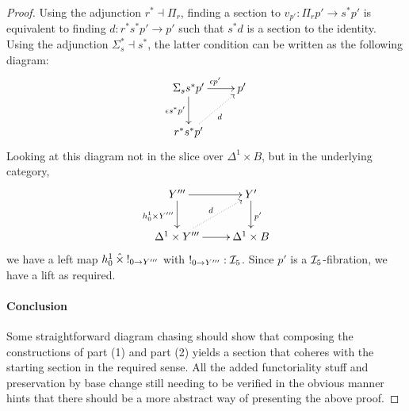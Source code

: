 \documentclass[reqno,10pt,a4paper,oneside]{amsart}
\begin{document}
\begin{proof}
Using the adjunction $r^* \dashv \Pi_r$, finding a section to $v_{p'} : \Pi_r p' \to s^* p'$ is equivalent to finding $d : r^* s^* p' \to p'$ such that $s^* d$ is a section to the identity.
Using the adjunction $\Sigma_s^* \dashv s^*$, the latter condition can be written as the following diagram:
\[
\xymatrix{
  \Sigma_s s^* p'
  \ar[r]^{\epsilon p'}
  \ar[d]_{\epsilon s^* p'}
&
  p'
\\
  r^* s^* p'
  \ar@{.>}[ur]_{d}
}
\]
Looking at this diagram not in the slice over $\Delta^1 \times B$, but in the underlying category,
\[
\xymatrix{
  Y'''
  \ar[d]_{h_0^1 \times Y'''}
  \ar[r]
&
  Y'
  \ar[d]^{p'}
\\
  \Delta^1 \times Y'''
  \ar[r]
  \ar@{.>}[ur]^{d}
&
  \Delta^1 \times B
}
\]
we have a left map $h_0^1 \hattimes \canonical_{0 \to Y'''}$ with $\canonical_{0 \to Y'''} : \cal{I}_5$.
Since $p'$ is a $\cal{I}_5$-fibration, we have a lift as required.

\paragraph{Conclusion}

Some straightforward diagram chasing should show that composing the constructions of part (1) and part (2) yields a section that coheres with the starting section in the required sense.
All the added functoriality stuff and preservation by base change still needing to be verified in the obvious manner hints that there should be a more abstract way of presenting the above proof.
\end{proof}
\end{document}
